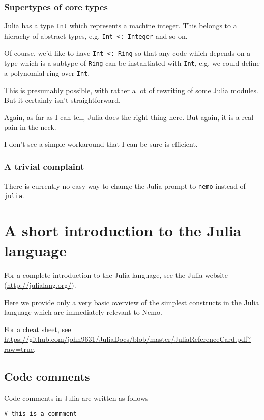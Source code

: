 \documentclass[a4paper,10pt]{article}
\newcommand{\code}{\lstinline}
\begin{document}
\subsubsection{Supertypes of core types}

Julia has a type \code{Int} which represents a machine integer. This belongs to a hierachy of abstract
types, e.g. \code{Int <: Integer} and so on. 

Of course, we'd like to have \code{Int <: Ring} so that any code which depends on a type which is a subtype
of \code{Ring} can be instantiated with \code{Int}, e.g. we could define a polynomial ring over \code{Int}.

This is presumably possible, with rather a lot of rewriting of some Julia modules. But it certainly isn't
straightforward.

Again, as far as I can tell, Julia does the right thing here. But again, it is a real pain in the neck.

I don't see a simple workaround that I can be sure is efficient.

\subsubsection{A trivial complaint}

There is currently no easy way to change the Julia prompt to \code{nemo} instead of \code{julia}.

\section{A short introduction to the Julia language}

For a complete introduction to the Julia language, see the Julia website (\url{http://julialang.org/}).

Here we provide only a very basic overview of the simplest constructs in the Julia language which are
immediately relevant to Nemo.

For a cheat sheet, see \url{https://github.com/john9631/JuliaDocs/blob/master/JuliaReferenceCard.pdf?raw=true}.


\subsection{Code comments}

Code comments in Julia are written as follows

\begin{lstlisting}
# this is a commment
\end{lstlisting}
\end{document}

